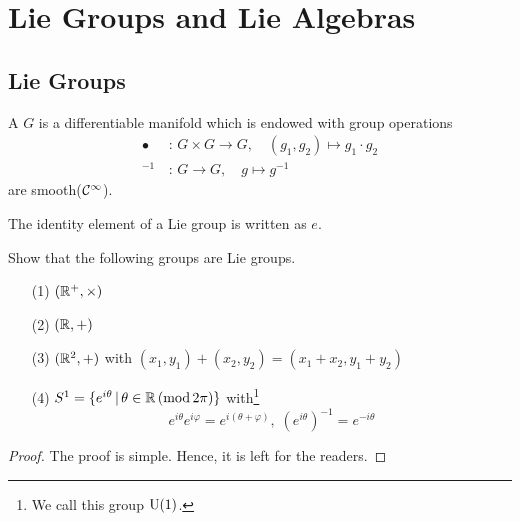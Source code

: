 \documentclass[a4paper, 10pt]{article}
\begin{document}
\setcounter{section}{7}
\section{Lie Groups and Lie Algebras}

\subsection{Lie Groups}

\begin{definition}
    A  $G$ is a differentiable manifold which is endowed with group operations
    \begin{align*}
        \bullet &\,:\, G \times G \rightarrow G, \quad (g_{1},g_{2}) \mapsto g_{1} \cdot g_{2} \\
        {}^{-1} &\,:\, G \rightarrow G, \quad g \mapsto g^{-1}
    \end{align*}
    are smooth($\mathcal{C}^{\infty}$).
\end{definition}

\begin{remark}
    The identity element of a Lie group is written as $e$.
\end{remark}

\begin{exer}
    Show that the following groups are Lie groups.
    \begin{itemize}
        \item[(1)] $(\mathbb{R}^{+}, \times)$
        \item[(2)] $(\mathbb{R}, +)$
        \item[(3)] $(\mathbb{R}^{2}, +)$ with $(x_{1},y_{1}) + (x_{2},y_{2}) = (x_{1}+x_{2},y_{1}+y_{2})$
        \item[(4)] $S^{1} = \{ e^{i\theta} \,|\, \theta \in \mathbb{R} \, (\mathrm{mod} \,2\pi)\}$ with\footnote{We call this group $\mathrm{U}(1)$.}
        \[ e^{i\theta}e^{i\varphi} = e^{i(\theta+\varphi)}, \; (e^{i\theta})^{-1} = e^{-i\theta} \]
    \end{itemize}
\end{exer}

\begin{proof}
    The proof is simple. Hence, it is left for the readers.
\end{proof}

\newpage

\end{document}
